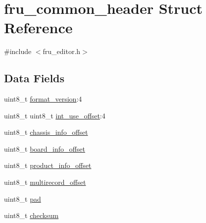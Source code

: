 \hypertarget{structfru__common__header}{\section{fru\-\_\-common\-\_\-header Struct Reference}
\label{structfru__common__header}
}


{\ttfamily \#include $<$fru\-\_\-editor.\-h$>$}

\subsection*{Data Fields}
\begin{DoxyCompactItemize}
\item 
uint8\-\_\-t \hyperlink{structfru__common__header_a090541d964200c54c3f2faaab395cf33}{format\-\_\-version}\-:4
\item 
uint8\-\_\-t uint8\-\_\-t \hyperlink{structfru__common__header_a234f8a64b8169d629910422d894a76b7}{int\-\_\-use\-\_\-offset}\-:4
\item 
uint8\-\_\-t \hyperlink{structfru__common__header_a2f10e49eacdef7036875fa43c7630328}{chassis\-\_\-info\-\_\-offset}
\item 
uint8\-\_\-t \hyperlink{structfru__common__header_a4c54e9061160526a130eae1932683238}{board\-\_\-info\-\_\-offset}
\item 
uint8\-\_\-t \hyperlink{structfru__common__header_ac11a8480218c4e5a8a2f3e8ed326eb32}{product\-\_\-info\-\_\-offset}
\item 
uint8\-\_\-t \hyperlink{structfru__common__header_af9ddba6fcd3a12b53ea6dd571efba1a5}{multirecord\-\_\-offset}
\item 
uint8\-\_\-t \hyperlink{structfru__common__header_a4530d71330dcaa5965775f7a6742f923}{pad}
\item 
uint8\-\_\-t \hyperlink{structfru__common__header_a32410dd1bbb78c5588a7e96ddd1d4aba}{checksum}
\end{DoxyCompactItemize}


